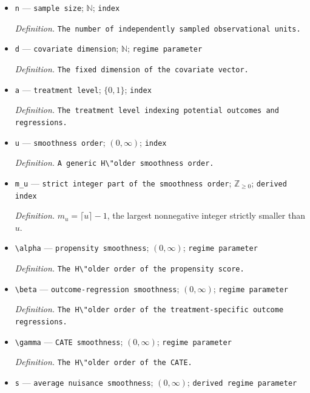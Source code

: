 \documentclass{article}
\begin{document}
\begin{itemize}
  \item \texttt{n} --- \texttt{sample size}; \(\mathbb{N}\); \texttt{index}
  \par\smallskip\noindent\emph{Definition.} \texttt{The number of independently sampled observational units.}
  \item \texttt{d} --- \texttt{covariate dimension}; \(\mathbb{N}\); \texttt{regime parameter}
  \par\smallskip\noindent\emph{Definition.} \texttt{The fixed dimension of the covariate vector.}
  \item \texttt{a} --- \texttt{treatment level}; \(\{0,1\}\); \texttt{index}
  \par\smallskip\noindent\emph{Definition.} \texttt{The treatment level indexing potential outcomes and regressions.}
  \item \texttt{u} --- \texttt{smoothness order}; \((0,\infty)\); \texttt{index}
  \par\smallskip\noindent\emph{Definition.} \texttt{A generic H\textbackslash{}\allowbreak{}"older smoothness order.}
  \item \texttt{m\_\allowbreak{}u} --- \texttt{strict integer part of the smoothness order}; \(\mathbb{Z}_{\ge0}\); \texttt{derived index}
  \par\smallskip\noindent\emph{Definition.} \(m_u=\lceil u\rceil-1\), the largest nonnegative integer strictly smaller than \(u\).
  \item \texttt{\textbackslash{}\allowbreak{}alpha} --- \texttt{propensity smoothness}; \((0,\infty)\); \texttt{regime parameter}
  \par\smallskip\noindent\emph{Definition.} \texttt{The H\textbackslash{}\allowbreak{}"older order of the propensity score.}
  \item \texttt{\textbackslash{}\allowbreak{}beta} --- \texttt{outcome-\allowbreak{}regression smoothness}; \((0,\infty)\); \texttt{regime parameter}
  \par\smallskip\noindent\emph{Definition.} \texttt{The H\textbackslash{}\allowbreak{}"older order of the treatment-\allowbreak{}specific outcome regressions.}
  \item \texttt{\textbackslash{}\allowbreak{}gamma} --- \texttt{CATE smoothness}; \((0,\infty)\); \texttt{regime parameter}
  \par\smallskip\noindent\emph{Definition.} \texttt{The H\textbackslash{}\allowbreak{}"older order of the CATE.}
  \item \texttt{s} --- \texttt{average nuisance smoothness}; \((0,\infty)\); \texttt{derived regime parameter}

\end{itemize}
\end{document}
